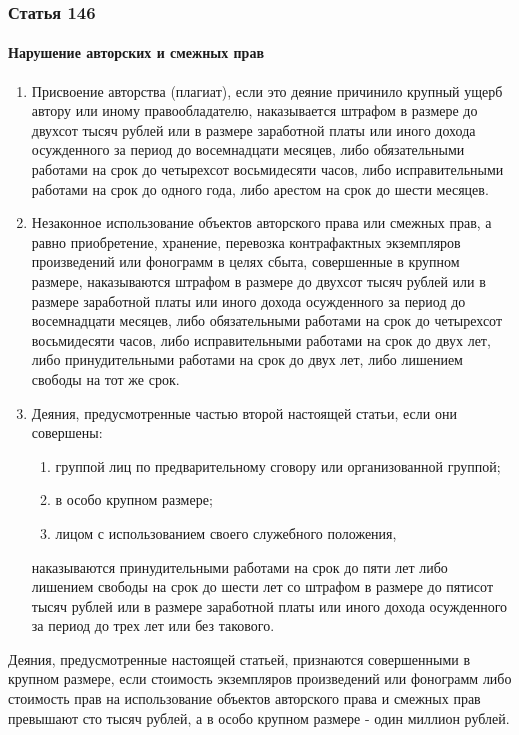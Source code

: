 \begin{frame}[allowframebreaks]
    \frametitle{Статья 146}
    \framesubtitle{Нарушение авторских и смежных прав}
    \begin{enumerate}
        \item Присвоение авторства (плагиат), если это деяние причинило крупный ущерб автору или иному правообладателю, наказывается штрафом в размере до двухсот тысяч рублей или в размере заработной платы или иного дохода осужденного за период до восемнадцати месяцев, либо обязательными работами на срок до четырехсот восьмидесяти часов, либо исправительными работами на срок до одного года, либо арестом на срок до шести месяцев.
        
        \item Незаконное использование объектов авторского права или смежных прав, а равно приобретение, хранение, перевозка контрафактных экземпляров произведений или фонограмм в целях сбыта, совершенные в крупном размере, наказываются штрафом в размере до двухсот тысяч рублей или в размере заработной платы или иного дохода осужденного за период до восемнадцати месяцев, либо обязательными работами на срок до четырехсот восьмидесяти часов, либо исправительными работами на срок до двух лет, либо принудительными работами на срок до двух лет, либо лишением свободы на тот же срок.
        
        \item Деяния, предусмотренные частью второй настоящей статьи, если они совершены:
        \begin{enumerate}
            \item группой лиц по предварительному сговору или организованной группой;
            \item в особо крупном размере;
            \item лицом с использованием своего служебного положения,
        \end{enumerate}
        наказываются принудительными работами на срок до пяти лет либо лишением свободы на срок до шести лет со штрафом в размере до пятисот тысяч рублей или в размере заработной платы или иного дохода осужденного за период до трех лет или без такового.
    \end{enumerate}
    Деяния, предусмотренные настоящей статьей, признаются совершенными в крупном размере, если стоимость экземпляров произведений или фонограмм либо стоимость прав на использование объектов авторского права и смежных прав превышают сто тысяч рублей, а в особо крупном размере - один миллион рублей.
\end{frame}


